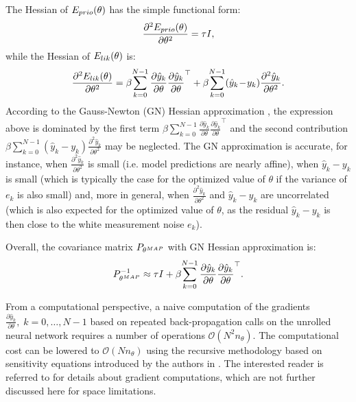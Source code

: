 \documentclass{ifacconf}
\newcommand{\nsamp}{N}
\newcommand{\npar}{{n_\theta}}
\newcommand{\MAP}{{\rm MAP}}
\newcommand{\mean}[1]{\hat{#1}}
\begin{document}
The Hessian of $E_{\rm prio}(\theta)$ has the simple functional form:
\begin{equation}
 \frac{\partial^2 E_{\rm prio}(\theta)}{\partial \theta^2} 
 = \tau I,
\end{equation}
while the Hessian of $E_{\rm lik}(\theta)$ is:
\begin{equation}
\label{eq:full_hessian}
\frac{\partial^2 E_{\rm lik}(\theta)}{\partial \theta^2}
=  \beta \!\sum_{k=0}^{\nsamp-1} \frac{\partial \mean{y}_k}{\partial \theta} {\frac{\partial \mean{y}_k}{\partial \theta}}^{\top} +%
\beta \!\sum_{k=0}^{\nsamp-1} (\mean{y}_k\! -\! y_k) \frac{\partial^2 \mean{y}_k}{\partial \theta^2}.
\end{equation}
According to the  Gauss-Newton (GN) Hessian approximation \citep{wright1999numerical}, the expression above  is dominated by the first term $\beta \!\sum_{k=0}^{\nsamp-1} \frac{\partial \mean{y}_k}{\partial \theta} {\frac{\partial \mean{y}_k}{\partial \theta}}^{\top}$ and the second contribution $\beta \sum_{k=0}^{\nsamp-1} (\mean{y}_k - y_k) \frac{\partial^2 \mean{y}_k}{\partial \theta^2}$ may be neglected.  The GN approximation is accurate, for instance, when $\frac{\partial^2 \mean{y}_k}{\partial \theta^2}$ is small (i.e. model predictions are nearly affine), when $\mean{y}_k - y_k$ is small (which is typically the case for the optimized value of $\theta$ if the variance of $e_k$ 
is also small) and, more in general, when $\frac{\partial^2 \mean{y}_k}{\partial \theta^2}$ and $\mean{y}_k - y_k$ are uncorrelated (which is also expected
for the optimized value of $\theta$, as the residual $\mean{y}_k - y_k$ is then close to the white measurement noise $e_k$).


Overall, the covariance matrix $P_{\theta^{\MAP}}$ with GN Hessian approximation is:
\begin{equation}
\label{eq:P_post}
P_{\theta^{\rm MAP}}^{-1} \approx \tau I + \beta \!\sum_{k=0}^{\nsamp-1} \frac{\partial \mean{y}_k}{\partial \theta} {\frac{\partial \mean{y}_k}{\partial \theta}}^\top.
\end{equation}

From a computational perspective, a naive computation of the gradients $\frac{\partial \mean{y}_k}{\partial \theta},\; k\!=\!0,\dots,\nsamp\!-\!1$ based on
repeated back-propagation calls on the unrolled neural network requires a number of operations $\mathcal{O}(N^2 \npar)$. 
The computational cost can be lowered to $\mathcal{O}(N \npar)$ using the recursive methodology based on sensitivity equations introduced by the authors in \cite{forgione2022adaptation}. The interested reader is referred to \cite{forgione2022adaptation} for details about gradient computations, which are 
not further discussed here for space limitations.
\end{document}
